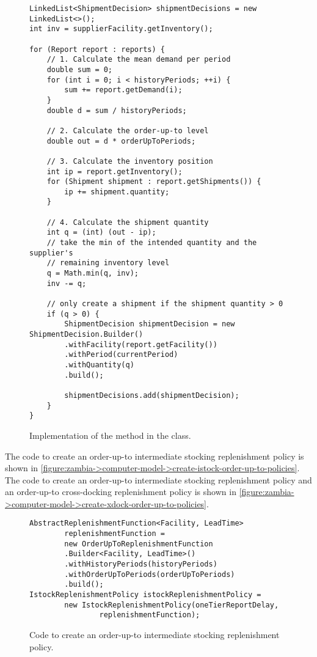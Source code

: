\begin{figure}[h!]
\begin{lstlisting}
LinkedList<ShipmentDecision> shipmentDecisions = new LinkedList<>();
int inv = supplierFacility.getInventory();

for (Report report : reports) {
    // 1. Calculate the mean demand per period
    double sum = 0;
    for (int i = 0; i < historyPeriods; ++i) {
        sum += report.getDemand(i);
    }
    double d = sum / historyPeriods;
    
    // 2. Calculate the order-up-to level
    double out = d * orderUpToPeriods;
    
    // 3. Calculate the inventory position
    int ip = report.getInventory();
    for (Shipment shipment : report.getShipments()) {
        ip += shipment.quantity;
    }
    
    // 4. Calculate the shipment quantity
    int q = (int) (out - ip);
    // take the min of the intended quantity and the supplier's
    // remaining inventory level
    q = Math.min(q, inv);
    inv -= q;
    
    // only create a shipment if the shipment quantity > 0
    if (q > 0) {
        ShipmentDecision shipmentDecision = new ShipmentDecision.Builder()
        .withFacility(report.getFacility())
        .withPeriod(currentPeriod)
        .withQuantity(q)
        .build();

        shipmentDecisions.add(shipmentDecision);
    }
}
\end{lstlisting}
\caption{Implementation of the  method in the
 class.}
\label{figure:zambia->computer-model->OrderUpToReplenishmentFunction}
\end{figure}

The code to create an order-up-to intermediate stocking replenishment policy
is shown in
\autoref{figure:zambia->computer-model->create-istock-order-up-to-policies}.
The code to create an order-up-to intermediate stocking replenishment policy
and an order-up-to cross-docking replenishment policy
is shown in
\autoref{figure:zambia->computer-model->create-xdock-order-up-to-policies}.

\begin{figure}[h!]
\begin{lstlisting}
AbstractReplenishmentFunction<Facility, LeadTime>
        replenishmentFunction =
        new OrderUpToReplenishmentFunction
        .Builder<Facility, LeadTime>()
        .withHistoryPeriods(historyPeriods)
        .withOrderUpToPeriods(orderUpToPeriods)
        .build();
IstockReplenishmentPolicy istockReplenishmentPolicy =
        new IstockReplenishmentPolicy(oneTierReportDelay,
                replenishmentFunction);
\end{lstlisting}
\caption{Code to create an order-up-to
intermediate stocking replenishment policy.}
\label{figure:zambia->computer-model->create-istock-order-up-to-policies}
\end{figure}


